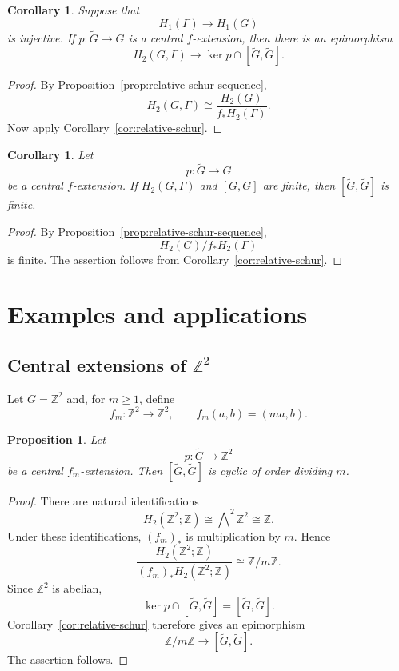 \documentclass[10pt]{amsart}
\newtheorem{proposition}[theorem]{Proposition}
\newtheorem{corollary}[theorem]{Corollary}
\renewcommand{\*}{\cdot {\dots} \cdot}
\newcommand{\?}[1]{\overset{?}{#1}}
\numberwithin{equation}{section}
\begin{document}
\begin{corollary}\label{cor:relative-homology-kernel}
Suppose that
\[
H_1(\Gamma)\longrightarrow H_1(G)
\]
is injective. If $p\colon\widetilde G\to G$ is a central
$f$-extension, then there is an epimorphism
\[
H_2(G,\Gamma)
\longrightarrow
\ker p\cap[\widetilde G,\widetilde G].
\]
\end{corollary}

\begin{proof}
By Proposition~\ref{prop:relative-schur-sequence},
\[
H_2(G,\Gamma)
\cong
\frac{H_2(G)}{f_*H_2(\Gamma)}.
\]
Now apply Corollary~\ref{cor:relative-schur}.
\end{proof}

\begin{corollary}\label{cor:relative-homology-schur}
Let
\[
p\colon\widetilde G\longrightarrow G
\]
be a central $f$-extension. If $H_2(G,\Gamma)$ and $[G,G]$
are finite, then $[\widetilde G,\widetilde G]$ is finite.
\end{corollary}

\begin{proof}
By Proposition~\ref{prop:relative-schur-sequence},
\[
H_2(G)/f_*H_2(\Gamma)
\]
is finite. The assertion follows from
Corollary~\ref{cor:relative-schur}.
\end{proof}



\section{Examples and applications}
\label{sec:applications}

\subsection{Central extensions of $\mathbb Z^2$}

Let $G=\mathbb Z^2$
and, for $m\geq 1$, define
\[
f_m\colon\mathbb Z^2\longrightarrow\mathbb Z^2,
\qquad
f_m(a,b)=(ma,b).
\]

\begin{proposition}\label{prop:Z2-example}
Let
\[
p\colon\widetilde G\longrightarrow\mathbb Z^2
\]
be a central $f_m$-extension. Then
$[\widetilde G,\widetilde G]$ is cyclic of order dividing $m$.
\end{proposition}

\begin{proof}
There are natural identifications
\[
H_2(\mathbb Z^2;\mathbb Z)
\cong
\bigwedge\nolimits^2\mathbb Z^2
\cong\mathbb Z.
\]
Under these identifications, $(f_m)_*$ is multiplication by
$m$. Hence
\[
\frac{H_2(\mathbb Z^2;\mathbb Z)}
     {(f_m)_*H_2(\mathbb Z^2;\mathbb Z)}
\cong
\mathbb Z/m\mathbb Z.
\]
Since $\mathbb Z^2$ is abelian,
\[
\ker p\cap[\widetilde G,\widetilde G]
=[\widetilde G,\widetilde G].
\]
Corollary~\ref{cor:relative-schur} therefore gives an
epimorphism
\[
\mathbb Z/m\mathbb Z
\longrightarrow
[\widetilde G,\widetilde G].
\]
The assertion follows.
\end{proof}
\end{document}
